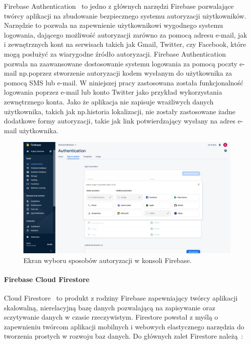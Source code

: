         Firebase Authentication~\cite{FIREBASE_AUTH} to jedno z głównych narzędzi Firebase pozwalające twórcy aplikacji na zbudowanie bezpiecznego systemu autoryzacji użytkowników. 
        Narzędzie to pozwala na zapewnienie użytkownikowi wygodnego systemu logowania, dającego możliwość autoryzacji zarówno za pomocą adresu e-mail, jak i zewnętrznych kont na serwisach takich
        jak Gmail, Twitter, czy Facebook, które mogą posłużyć za wiarygodne źródło autoryzacji. Firebase Authentication pozwala na zaawansowane dostosowanie systemu logowania za pomocą
        poczty e-mail np.\@ poprzez stworzenie autoryzacji kodem wysłanym do użytkownika za pomocą SMS lub e-mail. W niniejszej pracy zastosowana została funkcjonalność logowania poprzez e-mail 
        lub konto Twitter jako przykład wykorzystania zewnętrznego konta. Jako że aplikacja nie zapisuje wrażliwych danych użytkownika, takich jak np.\@ historia lokalizacji, nie zostały
        zastosowane żadne dodatkowe formy autoryzacji, takie jak link potwierdzający wysłany na adres e-mail użytkownika.
        
        \vspace{1cm}
        \begin{figure}[!ht]%
            \centering
            \includegraphics[scale=0.30]{src/firebase auth.png}
            \caption{Ekran wyboru sposobów autoryzacji w konsoli Firebase.\label{firebase_auth}}
            \qquad
        \end{figure} 

\newpage
        \paragraph{Firebase Cloud Firestore}
        Cloud Firestore~\cite{FIREBASE_FIRESTORE} to produkt z rodziny Firebase zapewniający twórcy aplikacji skalowalną, nierelacyjną bazę danych pozwalającą na zapisywanie oraz sczytywanie danych w 
        czasie rzeczywistym. Firestore powstał z myślą o zapewnieniu twórcom aplikacji mobilnych i webowych elastycznego narzędzia do tworzenia prostych w rozwoju baz danych. 
        Do głównych zalet Firestore należą~\cite{FIRESTORE_DOCS}: 
        
